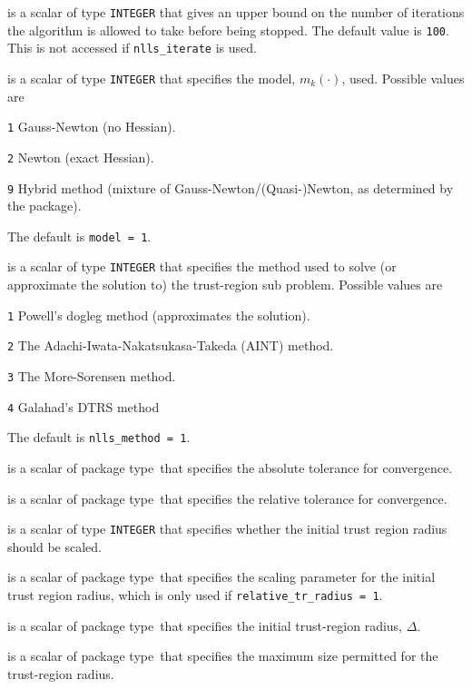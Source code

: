\documentclass{spec}
\newcommand{\scalarinteger}{is a scalar of type {\tt INTEGER} }
\newcommand{\scalarreal}{is a scalar of package type\ }
\begin{document}
\begin{description}

 \scalarinteger that gives an upper bound on the number
of iterations the algorithm is allowed to take before being stopped.  The default value is {\tt 100}.  This is not accessed if {\tt nlls\_iterate} is used.

 \scalarinteger that specifies the model, $m_k(\cdot)$, used.  Possible values are
\begin{description}
  \item{\tt 1} Gauss-Newton (no Hessian).
  \item{\tt 2} Newton (exact Hessian).
  \item{\tt 9} Hybrid method (mixture of Gauss-Newton/(Quasi-)Newton, as determined by the package).
\end{description}
The default is {\tt model = 1}.

 \scalarinteger that specifies the method used to solve
(or approximate the solution to) the trust-region sub problem.  Possible values are
\begin{description}
  \item{\tt 1} Powell's dogleg method (approximates the solution).
  \item{\tt 2} The Adachi-Iwata-Nakatsukasa-Takeda (AINT) method.
  \item{\tt 3} The More-Sorensen method.
  \item{\tt 4} {\sc Galahad}'s {\sc DTRS} method
\end{description}
The default is {\tt nlls\_method = 1}.

 \scalarreal that specifies the absolute tolerance for convergence.

 \scalarreal that specifies the relative tolerance for convergence.

 \scalarinteger that specifies whether the initial trust region
radius should be scaled.

 \scalarreal that specifies the scaling parameter for the initial trust region radius, which is only used if {\tt relative\_tr\_radius = 1}.

 \scalarreal that specifies the initial trust-region radius, $\Delta$.

 \scalarreal that specifies the maximum size permitted for the trust-region radius.


\end{description}
\end{document}
